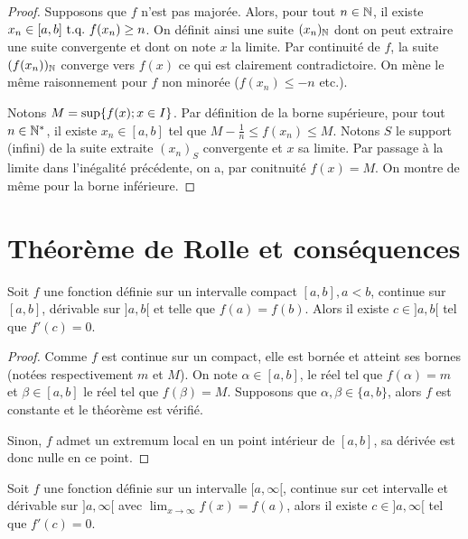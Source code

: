 \documentclass{article}
\begin{document}
\begin{proof}
Supposons que $f$ n'est pas majorée. Alors, pour tout $n \in \mathbb{N}$, il existe $x_n \in [a,b] \text{~t.q.~} f(x_n) \geq n$. On définit ainsi une suite
$(x_n)_{\mathbb{N}}$ dont on peut extraire une suite convergente  et dont on note $x$ la limite. Par continuité de $f$, la suite $(f(x_n))_{\mathbb{N}}$ converge
vers $f(x)$ ce qui est clairement contradictoire. On mène le même raisonnement pour $f$ non minorée ($f(x_n) \leq -n$ etc.). \newline

Notons $M = \sup \{ f(x) ; x \in I \}$. Par définition de la borne supérieure, pour tout $n \in \mathbb{N}^\ast$, il existe $x_n \in [a,b]$ tel que 
$M - \frac{1}{n} \leq f(x_n) \leq M$. Notons $S$ le support (infini) de la suite extraite $(x_n)_S$ convergente et $x$ sa limite. 
Par passage à la limite dans l'inégalité précédente, on a, par conitnuité $f(x) = M$. On montre de même pour la borne inférieure.
\end{proof}

\section{Théorème de Rolle et conséquences}

\begin{thm}[Rolle]
Soit $f$ une fonction définie sur un intervalle compact $[a,b], a<b$, continue sur $[a,b]$, dérivable sur $]a,b[$ et telle que $f(a)=f(b)$.
Alors il existe $c \in ]a,b[$ tel que $f'(c)=0$.
\end{thm}

\begin{proof}
Comme $f$ est continue sur un compact, elle est bornée et atteint ses bornes (notées respectivement $m$ et $M$). 
On note $\alpha \in [a,b]$, le réel tel que $f(\alpha) = m$ et $\beta \in [a,b]$ le réel tel que $f(\beta)=M$.
Supposons que $\alpha, \beta \in \{a, b\}$, alors $f$ est constante et le théorème est vérifié. \newline

Sinon, $f$ admet un extremum local en un point intérieur de $[a,b]$, sa dérivée est donc nulle en ce point.
\end{proof}

\begin{thm}
Soit $f$ une fonction définie sur un intervalle $[a, \infty[$, continue sur cet intervalle et dérivable sur $]a,\infty[$ avec 
$\lim_{x \to \infty} f(x) = f(a)$, alors il existe $c \in ]a,\infty[$ tel que $f'(c)=0$.
\end{thm}
\end{document}
